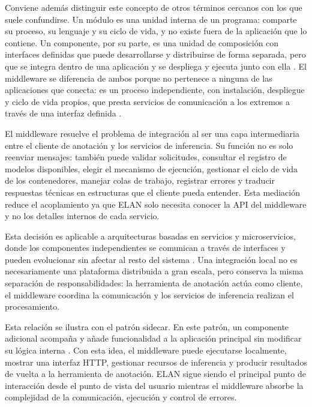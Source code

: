 \documentclass[11pt,a4paper]{article}
\begin{document}
Conviene además distinguir este concepto de otros términos cercanos con los que suele confundirse. Un módulo es una unidad interna de un programa: comparte su proceso, su lenguaje y su ciclo de vida, y no existe fuera de la aplicación que lo contiene. Un componente, por su parte, es una unidad de composición con interfaces definidas que puede desarrollarse y distribuirse de forma separada, pero que se integra dentro de una aplicación y se despliega y ejecuta junto con ella \cite{szyperski2002component}. El middleware se diferencia de ambos porque no pertenece a ninguna de las aplicaciones que conecta: es un proceso independiente, con instalación, despliegue y ciclo de vida propios, que presta servicios de comunicación a los extremos a través de una interfaz definida \cite{bernstein1996middleware}.

El middleware resuelve el problema de integración al ser una capa intermediaria entre el cliente de anotación y los servicios de inferencia. Su función no es solo reenviar mensajes: también puede validar solicitudes, consultar el registro de modelos disponibles, elegir el mecanismo de ejecución, gestionar el ciclo de vida de los contenedores, manejar colas de trabajo, registrar errores y traducir respuestas técnicas en estructuras que el cliente pueda entender. Esta mediación reduce el acoplamiento ya que ELAN solo necesita conocer la API del middleware y no los detalles internos de cada servicio.

Esta decisión es aplicable a arquitecturas basadas en servicios y microservicios, donde los componentes independientes se comunican a través de interfaces y pueden evolucionar sin afectar al resto del sistema \cite{dragoni2017microservices}. Una integración local no es necesariamente una plataforma distribuida a gran escala, pero conserva la misma separación de responsabilidades: la herramienta de anotación actúa como cliente, el middleware coordina la comunicación y los servicios de inferencia realizan el procesamiento.

Esta relación se ilustra con el patrón sidecar. En este patrón, un componente adicional acompaña y añade funcionalidad a la aplicación principal sin modificar su lógica interna \cite{burns2016container_patterns}. Con esta idea, el middleware puede ejecutarse localmente, mostrar una interfaz HTTP, gestionar recursos de inferencia y producir resultados de vuelta a la herramienta de anotación. ELAN sigue siendo el principal punto de interacción desde el punto de vista del usuario mientras el middleware absorbe la complejidad de la comunicación, ejecución y control de errores.
\end{document}
